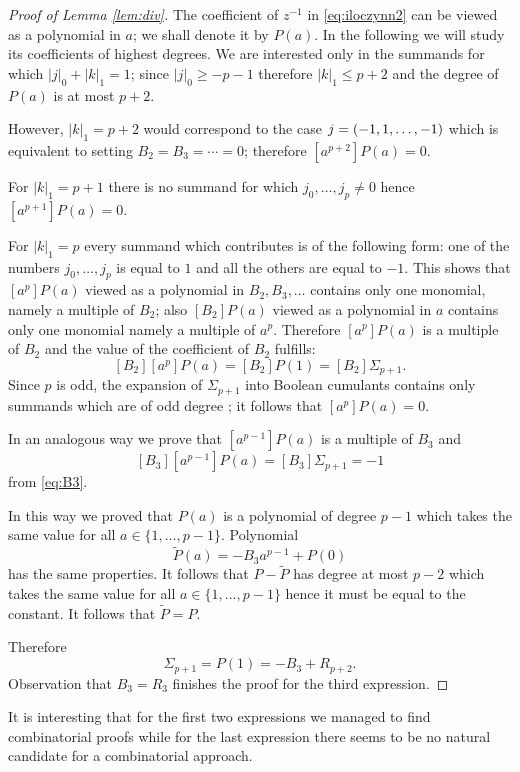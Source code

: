 \documentclass[12pt]{amsart}
\theoremstyle{plain}
\theoremstyle{remark}
\begin{document}
\begin{proof}[Proof of Lemma \ref{lem:div}]
The coefficient of $z^{-1}$ in \eqref{eq:iloczynn2} can be viewed as a
polynomial in $a$; we shall denote it by $P(a)$. In the following we will study
its coefficients of highest degrees. We are interested only in the
summands for which $|j|_0+|k|_1=1$; since $|j|_0\geq
-p-1$ therefore $|k|_1\leq p+2$ and the degree of $P(a)$ is at
most $p+2$. 

However, $|k|_1=p+2$ would correspond to the case
$j=(-1,\-1,\dots,-1)$ which is equivalent to setting $B_2=B_3=\cdots=0$;
therefore
$[a^{p+2}] P(a)=0$. 

For $|k|_1=p+1$ there is no summand for which
$j_0,\dots,j_p\neq 0$ hence $[a^{p+1}] P(a)=0$. 

For $|k|_1=p$ every
summand which contributes is of the following form: one of the numbers
$j_0,\dots,j_p$ is equal to $1$ and all the others are equal to $-1$. This 
shows that $[a^p] P(a)$ viewed as a polynomial in $B_2,B_3,\dots$ contains only
one monomial, namely a multiple of $B_2$; also $[B_2] P(a)$ viewed as a
polynomial in $a$ contains only one monomial namely a multiple of $a^p$. 
Therefore $[a^{p}]P(a)$ is a multiple of $B_2$ and the value of the
coefficient of $B_2$ fulfills:
$$[B_2][a^{p}]P(a)=[B_2] P(1)=[B_2] \Sigma_{p+1}. $$ 
Since $p$ is odd, the expansion of $\Sigma_{p+1}$ into Boolean cumulants
contains only summands which are of odd degree \cite{Biane2003}; it follows
that $[a^{p}]P(a)=0$.

In an analogous way we prove that $[a^{p-1}]P(a)$ is a multiple of $B_3$ and 
$$[B_3][a^{p-1}]P(a)=[B_3] \Sigma_{p+1}= -1 $$  
from \eqref{eq:B3}.

In this way we proved that $P(a)$ is a polynomial of degree $p-1$ which
takes the same value for all $a\in\{1,\dots,p-1\}$. Polynomial
$$\widetilde{P}(a)=  -B_3 a^{p-1} + P(0) $$
has the same properties. It follows that $P-\widetilde{P}$ has degree at most
$p-2$ which takes the same value for all $a\in\{1,\dots,p-1\}$ hence it must be
equal to the constant. It follows that $\widetilde{P}=P$.

Therefore 
$$ \Sigma_{p+1} = P(1) = -B_3 +  R_{p+2}. $$
Observation that $B_3=R_3$ finishes the proof for the third expression.
\end{proof}

It is
interesting that for the first two expressions we managed to find combinatorial
proofs while for the last expression there seems to be no natural candidate
for a combinatorial approach. 
\end{document}
